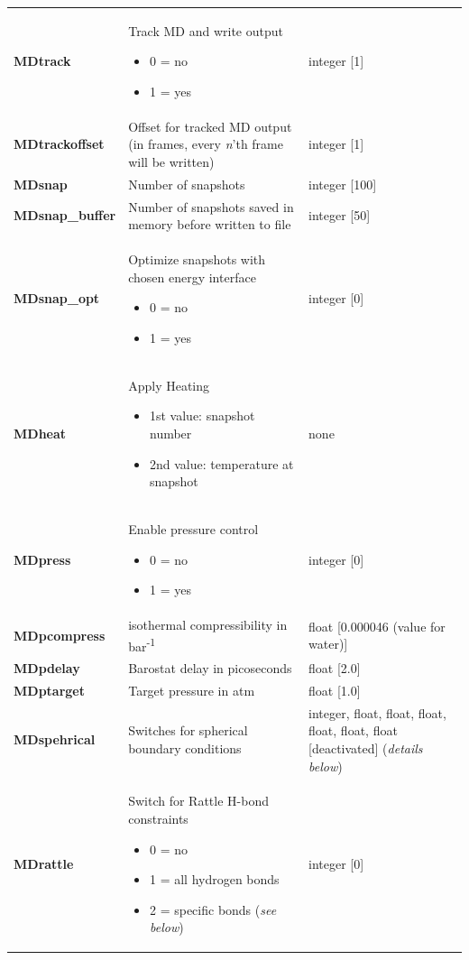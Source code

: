 \documentclass[10pt,a4paper]{article} %
\begin{document}
\begin{longtable}{|p{3.5cm}|p{5cm}|p{3cm}|}
		\textbf{MDtrack} & Track MD and write output\begin{itemize} \item 0 = no \item 1 = yes\end{itemize}& integer [1] \\
		\textbf{MDtrackoffset} & Offset for tracked MD output (in frames, every \textit{n}'th frame will be written)& integer [1] \\
		\textbf{MDsnap} & Number of snapshots & integer [100] \\
		\textbf{MDsnap\_buffer} & Number of snapshots saved in memory before written to file & integer [50] \\
		\textbf{MDsnap\_opt} & Optimize snapshots with chosen energy interface\begin{itemize} \item 0 = no \item 1 = yes\end{itemize} & integer [0] \\
		\textbf{MDheat}  & Apply Heating \begin{itemize}\item1st value: snapshot number\item2nd value: temperature at snapshot\end{itemize} & none\\
		\textbf{MDpress} & Enable pressure control\begin{itemize} \item 0 = no \item 1 = yes\end{itemize}& integer [0]\\
		\textbf{MDpcompress} & isothermal compressibility in bar\textsuperscript{-1} & float [0.000046 (value for water)] \\ 
		\textbf{MDpdelay} & Barostat delay in picoseconds & float [2.0]\\
		\textbf{MDptarget} & Target pressure in atm & float [1.0] \\
		\textbf{MDspehrical} & Switches for spherical boundary conditions & integer, float, float, float, float, float, float [deactivated] (\textit{details below}) \\
		\textbf{MDrattle} & Switch for Rattle\supercite{rattle} H-bond constraints\begin{itemize} \item 0 = no \item 1 = all hydrogen bonds \item 2 = specific bonds (\textit{see below}) \end{itemize} & integer [0] \\

\end{longtable}
\end{document}
